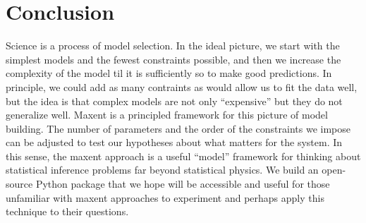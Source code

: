 \documentclass[aps,prl,twocolumn,nofootinbib]{revtex4-1}
\begin{document}
\section{Conclusion}
Science is a process of model selection. In the ideal picture, we start with the simplest models and the fewest constraints possible, and then we increase the complexity of the model til it is sufficiently so to make good predictions. In principle, we could add as many contraints as would allow us to fit the data well, but the idea is that complex models are not only ``expensive'' but they do not generalize well.
Maxent is a principled framework for this picture of model building. The number of parameters and the order of the constraints we impose can be adjusted to test our hypotheses about what matters for the system.
In this sense, the maxent approach is a useful ``model'' framework for thinking about statistical inference problems far beyond statistical physics. We build an open-source Python package that we hope will be accessible and useful for those unfamiliar with maxent approaches to experiment and perhaps apply this technique to their questions.
\end{document}
